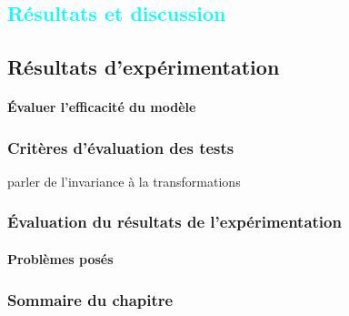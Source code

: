 
%
%

\textcolor{cyan}{\chapter{Résultats et discussion}}
\section{Résultats d'expérimentation}

	\subsubsection{Évaluer l'efficacité du modèle}
	
	\lipsum[1]

	\subsection{Critères d'évaluation des tests}
	parler de l'invariance à la transformations
	
	 
	\lipsum[1] 
 
	\subsection{Évaluation du résultats de l'expérimentation}
	\lipsum[1] 
	\subsubsection{Problèmes posés}
	\lipsum[1] 
	\subsection{Sommaire du chapitre}
	\lipsum[1] 
	\lipsum[1] 
	

